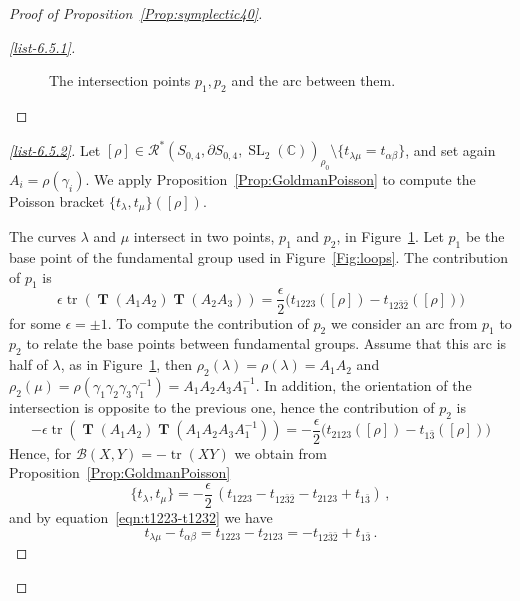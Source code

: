 \documentclass[11pt]{article}
\theoremstyle{definition}
\newenvironment{proofc}{\begin{proof}}{\end{proof}}
\numberwithin{equation}{section}
\numberwithin{figure}{section}
\numberwithin{table}{section}
\DeclareMathOperator{\SL}{SL}
\DeclareMathOperator{\tr}{tr}
\newcommand{\Bcal}{\mathcal{B}}
\newcommand{\Rcal}{\mathcal{R}}
\newcommand{\Cbb}{\mathbb{C}}
\newcommand{\Tbf}{\mathbf{T}}
\begin{document}
\begin{proofc}[Proof of Proposition~\ref{Prop:symplectic40}]
\begin{proof}[\eqref{list-6.5.1}]
\begin{figure}[h]
\begin{center}
\end{center}
\caption{The intersection points $p_1,p_2$ and the arc between them.}\label{Fig:intersection}
\end{figure}
\let\qed\relax
\end{proof}

\begin{proof}[\eqref{list-6.5.2}]
Let $[\rho]\in \Rcal^*(S_{0,4},\partial S_{0,4}, \SL_2(\Cbb))_{\rho_0}\setminus\{t_{\lambda\mu}=t_{\alpha\beta}\}$, and set again $A_i=\rho(\gamma_i)$. We apply Proposition~\ref{Prop:GoldmanPoisson} to compute the Poisson bracket $\{t_\lambda,t_\mu\}([\rho])$.

The curves $\lambda$ and $\mu$ intersect in two points, $p_1$ and $p_2$, in Figure~\ref{Fig:intersection}. Let $p_1$ be the base point of the fundamental group used in Figure~\ref{Fig:loops}. The contribution of $p_1$ is
\[
\epsilon \tr(\operatorname{\Tbf}(A_1A_2) \operatorname{\Tbf}(A_2A_3))=
\frac{\epsilon }2\big(t_{1223}([\rho]) -t_{12\bar3\bar 2}([\rho])\big)
\]
for some $\epsilon=\pm 1$. To compute the contribution of $p_2$ we consider an arc from $p_1$ to $p_2$ to relate the base points between fundamental groups. Assume that this arc is half of $\lambda$, as in Figure~\ref{Fig:intersection}, then $\rho_2(\lambda)=\rho(\lambda)=A_1A_2$ and $\rho_2(\mu)=\rho(\gamma_1\gamma_2\gamma_3 \gamma_1^{-1})= A_1 A_2 A_3 A_1^{-1}$. In addition, the orientation of the intersection is opposite to the previous one, hence the contribution of $p_2$ is
\[
-\epsilon
\tr(\operatorname{\Tbf}(A_1A_2) \operatorname{\Tbf}(A_1 A_2 A_3 A_1^{-1}))=- \frac{\epsilon }2 \big(t_{2123}([\rho]) -t_{1\bar 3}([\rho])\big)
\]
Hence, for $\Bcal(X,Y)=-\tr(X Y)$ we obtain from Proposition~\ref{Prop:GoldmanPoisson}
\[
\{t_\lambda,t_\mu\}= -\frac\epsilon2\,(t_{1223} -t_{12\bar3\bar 2}-t_{2123} +t_{1\bar 3}) \,,
\]
and by equation~\eqref{eqn:t1223-t1232} we have
\[
t_{\lambda\mu} - t_{\alpha\beta} = t_{1223} -t_{2123}= -t_{12\bar3\bar 2} +t_{1\bar 3}\,.
\]


\end{proof}
\end{proofc}
\end{document}
